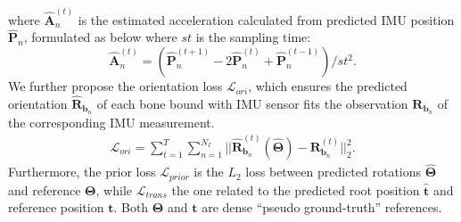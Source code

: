 \documentclass[letterpaper]{article} \usepackage{aaai23}  \usepackage{times}  \usepackage{helvet}  \usepackage{courier}  \usepackage[hyphens]{url}  \usepackage{graphicx} \urlstyle{rm} \def\UrlFont{\rm}  \usepackage{natbib}  \usepackage{caption} \frenchspacing  \setlength{\pdfpagewidth}{8.5in}  \setlength{\pdfpageheight}{11in}  \usepackage{algorithm}
\begin{document}
where $\mathbf{\hat{A}}_n^{(t)}$ is the estimated acceleration calculated from predicted IMU position $\mathbf{\hat{P}}_n$, formulated as below where $st$ is the sampling time:
\begin{equation}
	\mathbf{\hat{A}}_n^{(t)} = (\mathbf{\hat{P}}_n^{(t+1)} - 2\mathbf{\hat{P}}_n^{(t)} + \mathbf{\hat{P}}_n^{(t-1)}) / st^2.
	\label{eq:acceleration}
\end{equation}
We further propose the orientation loss $\mathcal{L}_{ori}$, which ensures the predicted orientation $\mathbf{\hat{R}}_{\textbf{b}_n}$ of each bone bound with IMU sensor fits the observation $\mathbf{R}_{\textbf{b}_n}$ of the corresponding IMU measurement.
\begin{align}
	\mathcal{L}_{ori} = \sum_{t=1}^T \sum_{n=1}^{N_I} ||\mathbf{\hat{R}}_{\textbf{b}_n}^{(t)}(\mathbf{\hat{\Theta}})  - \mathbf{R}_{\textbf{b}_n}^{(t)}||_2^2.
\end{align}
Furthermore, the prior loss $\mathcal{L}_{prior}$ is the $L_2$ loss between predicted rotations $\mathbf{\hat{\Theta}}$ and reference $\mathbf{\Theta}$, while $\mathcal{L}_{trans}$ the one related to the predicted root position $\hat{\textbf{t}}$ and reference position $\textbf{t}$.
Both $\mathbf{\Theta}$ and $\textbf{t}$ are dense ``pseudo ground-truth'' references. 







 \begin{table*}[th]
	\begin{center}
		\centering
		
        \caption{Quantitative comparison of several previous state-of-the-art methods in terms of tracking accuracy and plausibility. }
		\label{tab:Comparison}
	\end{center}
	\vspace{-3mm}
\end{table*}
\end{document}
